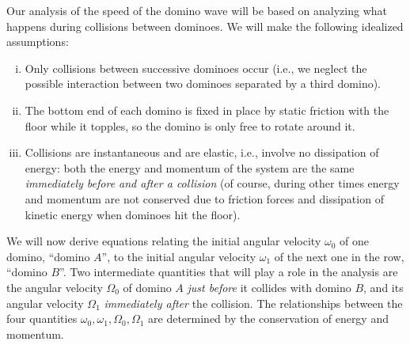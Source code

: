 \documentclass[12pt]{amsart}
\begin{document}
Our analysis of the speed of the domino wave will be based on analyzing what happens during collisions between dominoes. We will make the following idealized assumptions:
\begin{enumerate}[i.]
\item Only collisions between successive dominoes occur (i.e., we neglect the possible interaction between two dominoes separated by a third domino).
\item The bottom end of each domino is fixed in place by static friction with the floor while it topples, so the domino is only free to rotate around it.
\item Collisions are instantaneous and are elastic, i.e., involve no dissipation of energy: both the energy and momentum of the system are the same \emph{immediately before and after a collision} (of course, during other times energy and momentum are not conserved due to friction forces and dissipation of kinetic energy when dominoes hit the floor).
\end{enumerate}

We will now derive equations relating the initial angular velocity $\omega_0$ of one domino, ``domino $A$'', to the initial angular velocity $\omega_1$ of the next one in the row, ``domino $B$''. Two intermediate quantities that will play a role in the analysis are the angular velocity $\Omega_0$ of domino $A$ \emph{just before} it collides with domino $B$, and its angular velocity $\Omega_1$ \emph{immediately after} the collision. The relationships between the four quantities $\omega_0, \omega_1, \Omega_0, \Omega_1$ are determined by the conservation of energy and momentum.
\end{document}

